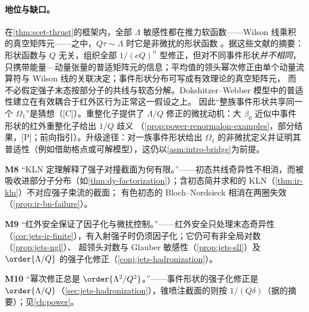 \paragraph{地位与缺口。}
在\cref{thm:scet-thrust}的框架内，全部 $\Lambda$ 敏感性都在推力软函数——Wilson 线乘积的真空矩阵元——之中，$Q\tau\sim\Lambda$ 时它是非微扰的形状函数
\cite{Korchemsky:1994is,Korchemsky:1999kt,Bauer:2003di,Lee:2006nr,Bauer:2008dt}。据这些文献的摘要：形状函数与 $Q$ 无关，组织全部 $1/(eQ)^n$ 型修正，但对不同事件形状\emph{并不相同}，
只携带能量—动量张量的普适矩阵元的信息\cite{Korchemsky:1999kt}；平均值的领头幂次修正由单个动量流算符与 Wilson 线的关联决定\cite{Lee:2006nr}；事件形状分布可写成有效理论的真空矩阵元，
而不必假定强子末态按部分子的共线与软态分解\cite{Bauer:2008dt}。Dokshitzer--Webber 模型中的普适性建立在有效耦合于红外区行为正常这一假设之上\cite{DokshitzerWebber1995}。
因此“整族事件形状共享同一个 $\Omega_1$”是猜想（[C]）。重整化子提供了 $\Lambda/Q$ 修正的微扰动机：大 $\beta_0$ 近似中事件形状的红外重整化子给出 $1/Q$ 歧义
（\cref{prop:power-renormalon-examples}，部分结果，[P]；前向指引）。升级途径：对一族事件形状给出 $\Omega_1$ 的非微扰定义并证明其普适性（例如借助格点或可解模型），这仍以\cref{asm:intro-bridge}为前提。

\begin{tcolorbox}[enhanced,breakable,title=常见误解（M8、M9、M10）,fonttitle=\bfseries,
  colback=gray!3!white,colframe=gray!55!black,boxrule=0.6pt,arc=2pt,
  left=5pt,right=5pt,top=3pt,bottom=3pt,before skip=6pt,after skip=6pt]
\textbf{M8} “KLN 定理解释了强子对撞截面为何有限。”——初态共线奇异性不相消，而被吸收进部分子分布（如\cref{thm:dy-factorization}）；含初态简并求和的 KLN（\cref{thm:ir-kln}）不对应强子束流的截面；
有色初态的 Bloch--Nordsieck 相消在两圈失效（\cref{prop:ir-bn-failure}）。\par
\textbf{M9} “红外安全保证了因子化与微扰控制。”——红外安全只处理末态奇异性（\cref{cor:jets-ir-finite}），有入射强子时仍须因子化；它仍可有非全局对数（\cref{prop:jets-ngl}）、
超领头对数与 Glauber 敏感性（\cref{prop:jets-sll}）及 $\order{\Lambda/Q}$ 的强子化修正（\cref{conj:jets-hadronization}）。\par
\textbf{M10} “幂次修正总是 $\order{\Lambda^2/Q^2}$。”——事件形状的强子化修正是 $\order{\Lambda/Q}$（\cref{sec:jets-hadronization}），锥喷注截面的则按 $1/(Q\delta)$（据\cite{Korchemsky:1994is}的摘要）；见\cref{ch:power}。
\end{tcolorbox}
